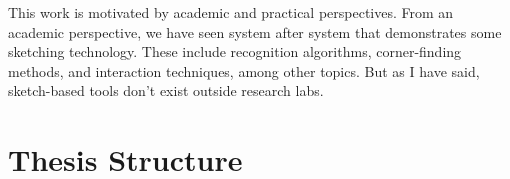 This work is motivated by academic and practical perspectives. From an
academic perspective, we have seen system after system that
demonstrates some sketching technology. These include recognition
algorithms, corner-finding methods, and interaction techniques, among
other topics. But as I have said, sketch-based tools don't exist
outside research labs.


\section{Thesis Structure}


